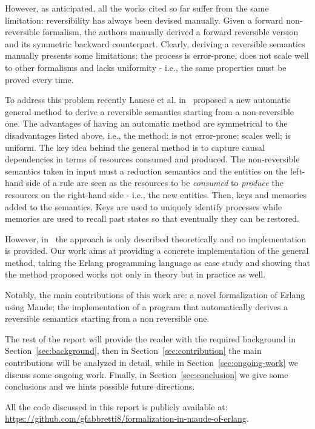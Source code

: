 \documentclass{article}[12pt,a4paper]
\theoremstyle{definition}
\begin{document}
However, as anticipated, all the works cited so far suffer from the same limitation: reversibility has always been
devised manually. Given a forward non-reversible formalism, the authors manually
derived a forward reversible version and its symmetric backward counterpart.
Clearly, deriving a reversible semantics manually presents some limitations: the
process is error-prone, does not scale well to other formalisms and lacks
uniformity - i.e., the same properties must be proved every time.

To address this problem recently Lanese et al. in~\cite{LaneseM20} proposed a
new automatic general method to
derive a reversible semantics starting from a non-reversible one. The
advantages of having an automatic method are symmetrical to the disadvantages
listed above, i.e., the method: is not error-prone; scales well; is uniform. The key idea behind the general method is to capture
causal dependencies in terms of resources consumed and produced. The non-reversible
semantics taken in input must a reduction semantics and the entities on the
left-hand side of a rule are seen as the resources to be \emph{consumed} to
\emph{produce} the resources on the right-hand side - i.e., the new entities.
Then, keys and memories added to the semantics. Keys are used to uniquely
identify processes while memories are used to recall past states so that
eventually they can be restored.

However, in~\cite{LaneseM20} the approach is only described theoretically and no
implementation is provided. Our work aims at providing a concrete implementation of the general method, taking the
Erlang programming language as case study and showing that the method
proposed works not only in theory but in practice as well.

Notably, the main contributions of this work are: a novel formalization of Erlang using
Maude; the implementation of a program that automatically derives a reversible
semantics starting from a non reversible one.

The rest of the report will provide the reader with the required background in
Section~\ref{sec:background}, then in Section~\ref{sec:contribution} the main
contributions will be analyzed in detail, while in
Section~\ref{sec:ongoing-work} we discuss some ongoing work. Finally, in
Section~\ref{sec:conclusion} we give some conclusions and we hints possible
future directions. 

All the code discussed in this report is publicly available at: \url{https://github.com/gfabbretti8/formalization-in-maude-of-erlang}.
\end{document}
